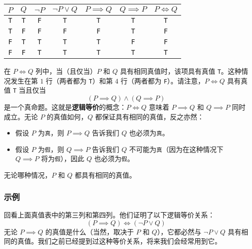 \begin{center}
    \begin{tabular}{c|c|c|c|c|c|c}
          $P$      & $Q$      & $\neg P$ &  $\neg P \lor Q$ & $P \implies Q$ & $Q \implies P$ & $P \iff Q$ \\
          \hline
          \verb|T| & \verb|T| & \verb|F| &      \verb|T|    &    \verb|T|    &    \verb|T|    & \verb|T|\\
          \verb|T| & \verb|F| & \verb|F| &      \verb|F|    &    \verb|F|    &    \verb|T|    & \verb|F|\\
          \verb|F| & \verb|T| & \verb|T| &      \verb|T|    &    \verb|T|    &    \verb|F|    & \verb|F|\\
          \verb|F| & \verb|F| & \verb|T| &      \verb|T|    &    \verb|T|    &    \verb|T|    & \verb|T|\\
    \end{tabular}
\end{center}
在 $P \iff Q$ 列中，当（且仅当）$P$ 和 $Q$ 具有相同真值时，该项具有真值 \verb|T|。这种情况发生在第 $1$ 行（两者都为 \verb|T|）和第 $4$ 行（两者都为 \verb|F|）。请注意，$P \iff Q$ 具有真值 \verb|T| 当且仅当
\[(P \implies Q) \land (Q \implies P)\]
是一个真命题。这就是\textbf{逻辑等价}的概念：$P \iff Q$ 意味着 $P \implies Q$ 和 $Q \implies P$ 同时成立。无论 $P$ 的真值如何，$Q$ 都保证具有相同的真值，反之亦然：
\begin{itemize}
    \item 假设 $P$ 为\verb|真|，则 $P \implies Q$ 告诉我们 $Q$ 也必须为\verb|真|。
    \item 假设 $P$ 为\verb|假|，则 $Q \implies P$ 告诉我们 $Q$ 不可能为\verb|真|（因为在这种情况下 $Q \implies P$ 将为\verb|假|），因此 $Q$ 也必须为\verb|假|。
\end{itemize}
无论哪种情况，$P$ 和 $Q$ 都具有相同的真值。

\subsubsection*{示例}

\begin{example}
    回看上面真值表中的第三列和第四列。他们证明了以下逻辑等价关系：
    \[(P \implies Q) \iff (\neg P \lor Q)\]
    无论 $P \implies Q$ 的真值是什么（当然，取决于 $P$ 和 $Q$），它都必然与 $\neg P \lor Q$ 具有相同的真值。我们之前已经提到过这种等价关系，将来我们会经常用到它。
\end{example}

